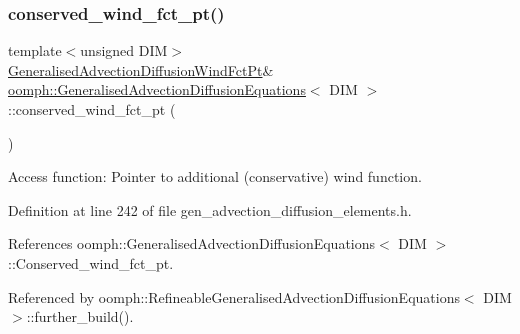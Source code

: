 \subsubsection{\texorpdfstring{conserved\+\_\+wind\+\_\+fct\+\_\+pt()}{conserved\_wind\_fct\_pt()}\hspace{0.1cm}{\footnotesize\ttfamily [1/2]}}
{\footnotesize\ttfamily template$<$unsigned D\+IM$>$ \\
\hyperlink{classoomph_1_1GeneralisedAdvectionDiffusionEquations_ac5a63eb03aee5957e7b14a4578423cfc}{Generalised\+Advection\+Diffusion\+Wind\+Fct\+Pt}\& \hyperlink{classoomph_1_1GeneralisedAdvectionDiffusionEquations}{oomph\+::\+Generalised\+Advection\+Diffusion\+Equations}$<$ D\+IM $>$\+::conserved\+\_\+wind\+\_\+fct\+\_\+pt (\begin{DoxyParamCaption}{ }\end{DoxyParamCaption})\hspace{0.3cm}{\ttfamily [inline]}}



Access function\+: Pointer to additional (conservative) wind function. 



Definition at line 242 of file gen\+\_\+advection\+\_\+diffusion\+\_\+elements.\+h.



References oomph\+::\+Generalised\+Advection\+Diffusion\+Equations$<$ D\+I\+M $>$\+::\+Conserved\+\_\+wind\+\_\+fct\+\_\+pt.



Referenced by oomph\+::\+Refineable\+Generalised\+Advection\+Diffusion\+Equations$<$ D\+I\+M $>$\+::further\+\_\+build().

\mbox{\label{classoomph_1_1GeneralisedAdvectionDiffusionEquations_a94a89a5a56af79c7924af36e2adc0038}} 
